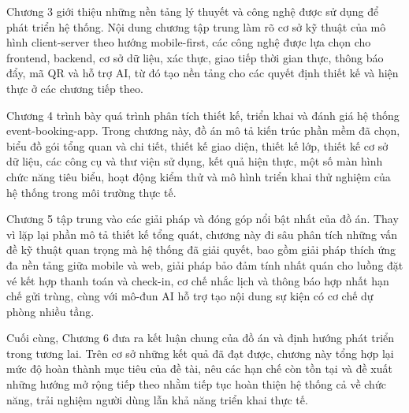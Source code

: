 \documentclass[../DoAn.tex]{subfiles}
\begin{document}
Chương 3 giới thiệu những nền tảng lý thuyết và công nghệ được sử dụng để phát triển hệ thống. Nội dung chương tập trung làm rõ cơ sở kỹ thuật của mô hình client-server theo hướng mobile-first, các công nghệ được lựa chọn cho frontend, backend, cơ sở dữ liệu, xác thực, giao tiếp thời gian thực, thông báo đẩy, mã \gls{QR} và hỗ trợ AI, từ đó tạo nền tảng cho các quyết định thiết kế và hiện thực ở các chương tiếp theo.

Chương 4 trình bày quá trình phân tích thiết kế, triển khai và đánh giá hệ thống event-booking-app. Trong chương này, đồ án mô tả kiến trúc phần mềm đã chọn, biểu đồ gói tổng quan và chi tiết, thiết kế giao diện, thiết kế lớp, thiết kế cơ sở dữ liệu, các công cụ và thư viện sử dụng, kết quả hiện thực, một số màn hình chức năng tiêu biểu, hoạt động kiểm thử và mô hình triển khai thử nghiệm của hệ thống trong môi trường thực tế.

Chương 5 tập trung vào các giải pháp và đóng góp nổi bật nhất của đồ án. Thay vì lặp lại phần mô tả thiết kế tổng quát, chương này đi sâu phân tích những vấn đề kỹ thuật quan trọng mà hệ thống đã giải quyết, bao gồm giải pháp thích ứng đa nền tảng giữa mobile và web, giải pháp bảo đảm tính nhất quán cho luồng đặt vé kết hợp thanh toán và check-in, cơ chế nhắc lịch và thông báo hợp nhất hạn chế gửi trùng, cùng với mô-đun AI hỗ trợ tạo nội dung sự kiện có cơ chế dự phòng nhiều tầng.

Cuối cùng, Chương 6 đưa ra kết luận chung của đồ án và định hướng phát triển trong tương lai. Trên cơ sở những kết quả đã đạt được, chương này tổng hợp lại mức độ hoàn thành mục tiêu của đề tài, nêu các hạn chế còn tồn tại và đề xuất những hướng mở rộng tiếp theo nhằm tiếp tục hoàn thiện hệ thống cả về chức năng, trải nghiệm người dùng lẫn khả năng triển khai thực tế.
\end{document}
